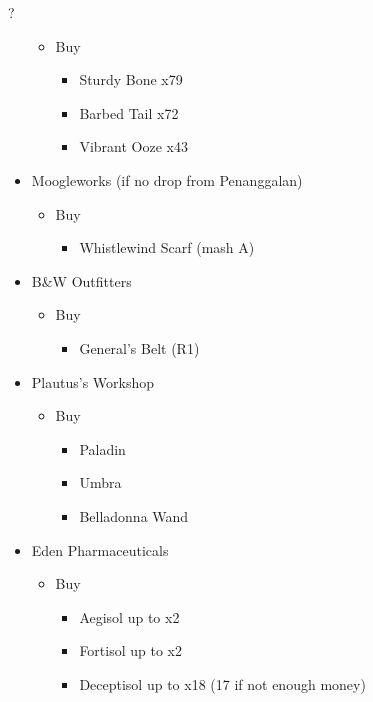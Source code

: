 \begin{shop}{?}
\begin{itemize}
			\begin{itemize}
				\item Buy
					\begin{itemize}
						\item Sturdy Bone x79
						\item Barbed Tail x72
						\item Vibrant Ooze x43
					\end{itemize}
			\end{itemize}
		\item Moogleworks (if no drop from Penanggalan)
			\begin{itemize}
				\item Buy
					\begin{itemize}
						\item Whistlewind Scarf (mash A)
					\end{itemize}
			\end{itemize}	
		\item B\&W Outfitters
			\begin{itemize}
				\item Buy
					\begin{itemize}
						\item General's Belt (R1)
					\end{itemize}
			\end{itemize}
		\item Plautus's Workshop
			\begin{itemize}
				\item Buy
					\begin{itemize}
						\item Paladin
						\item Umbra
						\item Belladonna Wand
					\end{itemize}
			\end{itemize}	
		\item Eden Pharmaceuticals
			\begin{itemize}
				\item Buy
					\begin{itemize}
						\item Aegisol up to x2
						\item Fortisol up to x2
						\item Deceptisol up to x18 (17 if not enough money)
					\end{itemize}
			\end{itemize}											
	\end{itemize}
\end{shop}

